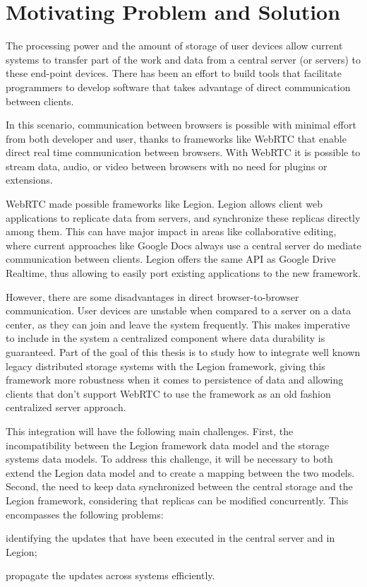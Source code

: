 \section{Motivating Problem and Solution}
\label{sec:motivating_problem_and_solution}
The processing power and the amount of storage of user devices allow current systems to transfer part of the work and data from a central server (or servers) to these end-point devices. There has been an effort to build tools that facilitate programmers to develop software that takes advantage of direct communication between clients.\par
	In this scenario, communication between browsers is possible with minimal effort from both developer and user, thanks to frameworks like WebRTC that enable direct real time communication between browsers. With WebRTC it is possible to stream data, audio, or video between browsers with no need for plugins or extensions.\par
	WebRTC made possible frameworks like Legion. Legion allows client web applications to replicate data from servers, and synchronize these replicas directly among them. This can have major impact in areas like collaborative editing, where current approaches like Google Docs always use a central server do mediate communication between clients. Legion offers the same API as Google Drive Realtime, thus allowing to easily port existing applications to the new framework.\par
	However, there are some disadvantages in direct browser-to-browser communication. User devices are unstable when compared to a server on a data center, as they can join and leave the system frequently. This makes imperative to include in the system a centralized component where data durability is guaranteed. Part of the goal of this thesis is to study how to integrate well known legacy distributed storage systems with the Legion framework, giving this framework more robustness when it comes to persistence of data and allowing clients that don't support WebRTC to use the framework as an old fashion centralized server approach.\par
	This integration will have the following main challenges. First, the incompatibility  between the Legion framework data model and the storage systems data models. To address this challenge, it will be necessary to both extend the Legion data model and to create a mapping between the two models. Second, the need to keep data synchronized between the central storage and the Legion framework, considering that replicas can be modified concurrently. This encompasses the following problems: \begin{enumerate*}[(i)]
		\item identifying the updates that have been executed in the central server and in Legion; 
		\item propagate the updates across systems efficiently. 
	\end{enumerate*}
